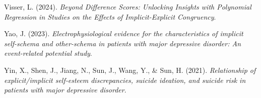 \documentclass[
  man,
  floatsintext,
  longtable,
  nolmodern,
  notxfonts,
  notimes,
  colorlinks=true,linkcolor=blue,citecolor=blue,urlcolor=blue]{apa7}
\newlength{\cslhangindent}
\newenvironment{CSLReferences}[2] %
 {\begin{list}{}{%
  \setlength{\itemindent}{0pt}
  \setlength{\leftmargin}{0pt}
  \setlength{\parsep}{0pt}
  \ifodd #1
   \setlength{\leftmargin}{\cslhangindent}
   \setlength{\itemindent}{-1\cslhangindent}
  \fi
  \setlength{\itemsep}{#2\baselineskip}}}
 {\end{list}}
\begin{document}
\begin{CSLReferences}{1}{0}
Visser, L. (2024). \emph{Beyond {Difference} {Scores}: {Unlocking}
{Insights} with {Polynomial} {Regression} in {Studies} on the {Effects}
of {Implicit}-{Explicit} {Congruency}}.

Yao, J. (2023). \emph{Electrophysiological evidence for the
characteristics of implicit self-schema and other-schema in patients
with major depressive disorder: {An} event-related potential study}.

Yin, X., Shen, J., Jiang, N., Sun, J., Wang, Y., \& Sun, H. (2021).
\emph{Relationship of explicit/implicit self‐esteem discrepancies,
suicide ideation, and suicide risk in patients with major depressive
disorder}.

\end{CSLReferences}
\end{document}
